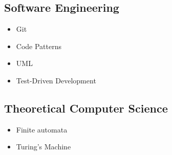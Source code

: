 \documentclass[a4paper,12pt]{article}
\begin{document}
\subsection*{Software Engineering}

\begin{multicols}{2}
\begin{itemize}
    \item Git
    \item Code Patterns
    \item UML
    \item Test-Driven Development 
\end{itemize}
\end{multicols}

\subsection*{Theoretical Computer Science}

\begin{multicols}{2}

\begin{itemize}
    \item Finite automata
    \item Turing's Machine
\end{itemize}

\end{multicols}
\end{document}
